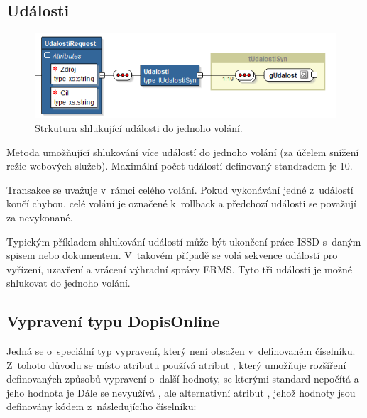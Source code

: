 \documentclass[
  master,
  field=ainfp,
  biblatex,
  language=czech,
  glossaries,
  theorems=false,
  index
]{kidiplom}
\begin{document}
\subsection{Události}
\begin{figure}[h]
  \centerline{\includegraphics[width=0.9\linewidth]{./images/UdalostiRequest.png}} 
  \caption{Strkutura shlukující události do jednoho volání.} 
\end{figure} 
Metoda umožňující shlukování více událostí do jednoho volání (za účelem snížení režie webových služeb). Maximální počet událostí definovaný standradem je 10.

Transakce se uvažuje v~rámci celého volání. Pokud vykonávání jedné z~událostí končí chybou, celé volání je označené k~rollback a předchozí události se považují za nevykonané.

Typickým příkladem shlukování událostí může být ukončení práce ISSD s~daným spisem nebo dokumentem. V~takovém případě se volá sekvence událostí pro vyřízení, uzavření a vrácení výhradní správy ERMS. Tyto tři události je možné shlukovat do jednoho volání.


\subsection{Vypravení typu DopisOnline}
Jedná se o~speciální typ vypravení, který není obsažen v~definovaném číselníku. Z~tohoto důvodu se místo atributu  používá atribut , který umožňuje rozšíření definovaných způsobů vypravení o~další hodnoty, se kterými standard nepočítá a jeho hodnota je  Dále se nevyužívá , ale alternativní atribut , jehož hodnoty jsou definovány kódem z~následujícího číselníku:
\end{document}
